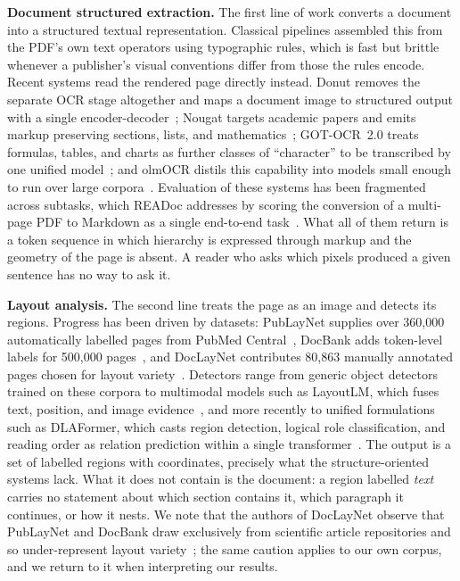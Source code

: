 \documentclass[11pt,twoside]{article}
\begin{document}
\textbf{Document structured extraction.} The first line of work converts a document into a structured textual representation. Classical pipelines assembled this from the PDF's own text operators using typographic rules, which is fast but brittle whenever a publisher's visual conventions differ from those the rules encode. Recent systems read the rendered page directly instead. Donut removes the separate OCR stage altogether and maps a document image to structured output with a single encoder-decoder~\cite{donut}; Nougat targets academic papers and emits markup preserving sections, lists, and mathematics~\cite{nougat}; GOT-OCR~2.0 treats formulas, tables, and charts as further classes of ``character'' to be transcribed by one unified model~\cite{gotocr}; and olmOCR distils this capability into models small enough to run over large corpora~\cite{olmocr}. Evaluation of these systems has been fragmented across subtasks, which READoc addresses by scoring the conversion of a multi-page PDF to Markdown as a single end-to-end task~\cite{readoc}. What all of them return is a token sequence in which hierarchy is expressed through markup and the geometry of the page is absent. A reader who asks which pixels produced a given sentence has no way to ask it.

\textbf{Layout analysis.} The second line treats the page as an image and detects its regions. Progress has been driven by datasets: PubLayNet supplies over 360,000 automatically labelled pages from PubMed Central~\cite{publaynet}, DocBank adds token-level labels for 500,000 pages~\cite{docbank}, and DocLayNet contributes 80,863 manually annotated pages chosen for layout variety~\cite{doclaynet}. Detectors range from generic object detectors trained on these corpora to multimodal models such as LayoutLM, which fuses text, position, and image evidence~\cite{layoutlm}, and more recently to unified formulations such as DLAFormer, which casts region detection, logical role classification, and reading order as relation prediction within a single transformer~\cite{dlaformer}. The output is a set of labelled regions with coordinates, precisely what the structure-oriented systems lack. What it does not contain is the document: a region labelled \emph{text} carries no statement about which section contains it, which paragraph it continues, or how it nests. We note that the authors of DocLayNet observe that PubLayNet and DocBank draw exclusively from scientific article repositories and so under-represent layout variety~\cite{doclaynet}; the same caution applies to our own corpus, and we return to it when interpreting our results.
\end{document}
